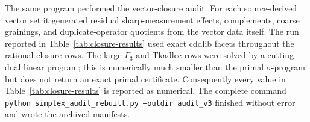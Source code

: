 \documentclass[aps,pra,twocolumn,superscriptaddress,nofootinbib]{revtex4-2}
\begin{document}
The same program performed the vector-closure audit.  For each source-derived vector
set it generated residual sharp-measurement effects, complements, coarse
grainings, and duplicate-operator quotients from the vector data itself.  The
run reported in Table~\ref{tab:closure-results} used exact cddlib facets
throughout the rational closure rows.  The large $\Gamma_3$ and Tkadlec rows were solved by a
cutting-dual linear program; this is numerically much smaller than the primal
\(\sigma\)-program but does not return an exact primal certificate.
Consequently every value in Table~\ref{tab:closure-results} is reported as
numerical.  The complete command
\texttt{python simplex\_audit\_rebuilt.py --outdir audit\_v3}
finished without error and wrote the archived manifests.


\end{document}
